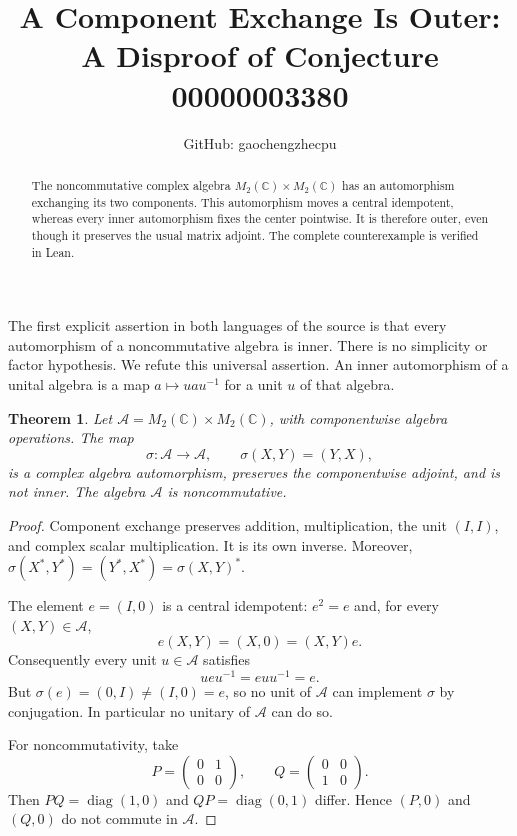 \documentclass[11pt]{article}
\title{A Component Exchange Is Outer:\\A Disproof of Conjecture 00000003380}
\author{GitHub: gaochengzhecpu}
\date{}
\newtheorem{theorem}{Theorem}
\newcommand{\C}{\mathbb C}
\newcommand{\A}{\mathcal A}
\begin{document}
\maketitle
\begin{abstract}
The noncommutative complex algebra $M_2(\C)\times M_2(\C)$ has an
automorphism exchanging its two components. This automorphism moves a
central idempotent, whereas every inner automorphism fixes the center
pointwise. It is therefore outer, even though it preserves the usual
matrix adjoint. The complete counterexample is verified in Lean.
\end{abstract}

The first explicit assertion in both languages of the source is that
every automorphism of a noncommutative algebra is inner. There is no
simplicity or factor hypothesis. We refute this universal assertion.
An inner automorphism of a unital algebra is a map $a\mapsto uau^{-1}$
for a unit $u$ of that algebra.

\begin{theorem}
Let $\A=M_2(\C)\times M_2(\C)$, with componentwise algebra operations.
The map
\[
 \sigma:\A\longrightarrow\A,\qquad \sigma(X,Y)=(Y,X),
\]
is a complex algebra automorphism, preserves the componentwise adjoint,
and is not inner. The algebra $\A$ is noncommutative.
\end{theorem}
\begin{proof}
Component exchange preserves addition, multiplication, the unit $(I,I)$,
and complex scalar multiplication. It is its own inverse. Moreover,
$\sigma(X^*,Y^*)=(Y^*,X^*)=\sigma(X,Y)^*$.

The element $e=(I,0)$ is a central idempotent: $e^2=e$ and, for every
$(X,Y)\in\A$,
\[
 e(X,Y)=(X,0)=(X,Y)e.
\]
Consequently every unit $u\in\A$ satisfies
\[
 ueu^{-1}=euu^{-1}=e.
\]
But $\sigma(e)=(0,I)\ne(I,0)=e$, so no unit of $\A$ can implement
$\sigma$ by conjugation. In particular no unitary of $\A$ can do so.

For noncommutativity, take
\[
 P=\begin{pmatrix}0&1\\0&0\end{pmatrix},\qquad
 Q=\begin{pmatrix}0&0\\1&0\end{pmatrix}.
\]
Then $PQ=\operatorname{diag}(1,0)$ and
$QP=\operatorname{diag}(0,1)$ differ. Hence $(P,0)$ and $(Q,0)$
do not commute in $\A$.
\end{proof}
\end{document}
